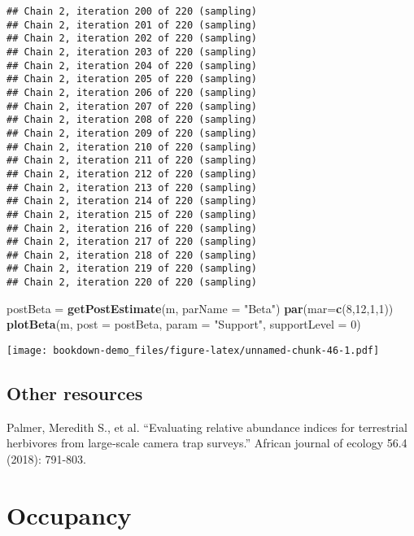 \documentclass[]{book}
\newenvironment{Shaded}{\begin{snugshade}}{\end{snugshade}}
\newcommand{\KeywordTok}[1]{\textcolor[rgb]{0.13,0.29,0.53}{\textbf{#1}}}
\newcommand{\DataTypeTok}[1]{\textcolor[rgb]{0.13,0.29,0.53}{#1}}
\newcommand{\DecValTok}[1]{\textcolor[rgb]{0.00,0.00,0.81}{#1}}
\newcommand{\StringTok}[1]{\textcolor[rgb]{0.31,0.60,0.02}{#1}}
\newcommand{\NormalTok}[1]{#1}
\begin{document}
\begin{verbatim}
## Chain 2, iteration 200 of 220 (sampling)
## Chain 2, iteration 201 of 220 (sampling)
## Chain 2, iteration 202 of 220 (sampling)
## Chain 2, iteration 203 of 220 (sampling)
## Chain 2, iteration 204 of 220 (sampling)
## Chain 2, iteration 205 of 220 (sampling)
## Chain 2, iteration 206 of 220 (sampling)
## Chain 2, iteration 207 of 220 (sampling)
## Chain 2, iteration 208 of 220 (sampling)
## Chain 2, iteration 209 of 220 (sampling)
## Chain 2, iteration 210 of 220 (sampling)
## Chain 2, iteration 211 of 220 (sampling)
## Chain 2, iteration 212 of 220 (sampling)
## Chain 2, iteration 213 of 220 (sampling)
## Chain 2, iteration 214 of 220 (sampling)
## Chain 2, iteration 215 of 220 (sampling)
## Chain 2, iteration 216 of 220 (sampling)
## Chain 2, iteration 217 of 220 (sampling)
## Chain 2, iteration 218 of 220 (sampling)
## Chain 2, iteration 219 of 220 (sampling)
## Chain 2, iteration 220 of 220 (sampling)
\end{verbatim}

\begin{Shaded}
\begin{Highlighting}[]
\NormalTok{postBeta =}\StringTok{ }\KeywordTok{getPostEstimate}\NormalTok{(m, }\DataTypeTok{parName =} \StringTok{"Beta"}\NormalTok{)}
\KeywordTok{par}\NormalTok{(}\DataTypeTok{mar=}\KeywordTok{c}\NormalTok{(}\DecValTok{8}\NormalTok{,}\DecValTok{12}\NormalTok{,}\DecValTok{1}\NormalTok{,}\DecValTok{1}\NormalTok{))}
\KeywordTok{plotBeta}\NormalTok{(m, }\DataTypeTok{post =}\NormalTok{ postBeta, }\DataTypeTok{param =} \StringTok{"Support"}\NormalTok{, }\DataTypeTok{supportLevel =} \DecValTok{0}\NormalTok{)}
\end{Highlighting}
\end{Shaded}

\texttt{[image: bookdown-demo\_files/figure-latex/unnamed-chunk-46-1.pdf]}

\section{Other resources}\label{other-resources}

Palmer, Meredith S., et al. ``Evaluating relative abundance indices for
terrestrial herbivores from large‐scale camera trap surveys.'' African
journal of ecology 56.4 (2018): 791-803.

\chapter{Occupancy}\label{occupancy}
\end{document}
